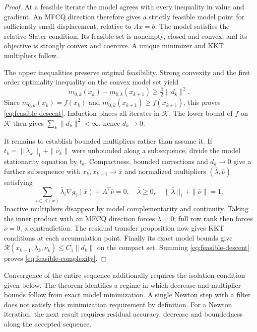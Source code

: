\documentclass[pdflatex,sn-mathphys-num]{sn-jnl}
\theoremstyle{thmstyleone}
\theoremstyle{thmstylethree}
\begin{document}
\begin{proof}
At a feasible iterate the model agrees with every inequality in value
and gradient. An MFCQ direction therefore gives a strictly feasible
model point for sufficiently small displacement, relative to $Ax=b$.
The model satisfies the relative Slater condition. Its feasible set is
nonempty, closed and convex, and its objective is strongly convex and
coercive. A unique minimizer and KKT multipliers follow.

The upper inequalities preserve original feasibility. Strong convexity
and the first order optimality inequality on the convex model set yield
\[
 m_{0,k}(x_k)-m_{0,k}(x_{k+1})
 \geq\tfrac\beta2\|d_k\|^2.
\]
Since $m_{0,k}(x_k)=f(x_k)$ and
$m_{0,k}(x_{k+1})\geq f(x_{k+1})$, this proves
\eqref{eq:feasible-descent}. Induction places all iterates in
$\mathcal K$. The lower bound of $f$ on $\mathcal K$ then gives
$\sum_k\|d_k\|^2<\infty$, hence $d_k\to0$.

It remains to establish bounded multipliers rather than assume it.
If $t_k=\|\lambda_k\|_1+\|\nu_k\|$ were unbounded along a
subsequence, divide the model stationarity equation by $t_k$.
Compactness, bounded corrections and $d_k\to0$ give a further
subsequence with $x_k,x_{k+1}\to\bar x$ and normalized multipliers
$(\bar\lambda,\bar\nu)$ satisfying
\[
 \sum_{i\in\mathcal A(\bar x)}\bar\lambda_i\nabla g_i(\bar x)
      +A^T\bar\nu=0,\quad
 \bar\lambda\geq0,\quad
 \|\bar\lambda\|_1+\|\bar\nu\|=1.
\]
Inactive multipliers disappear by model complementarity and
continuity. Taking the inner product with an MFCQ direction forces
$\bar\lambda=0$; full row rank then forces $\bar\nu=0$, a
contradiction. The residual transfer proposition now gives KKT
conditions at each accumulation point. Finally its exact model bounds
give $\mathcal R(x_{k+1},\lambda_k,\nu_k)\leq C_1\|d_k\|$
on the compact set. Summing \eqref{eq:feasible-descent} proves
\eqref{eq:feasible-complexity}.
\end{proof}

Convergence of the entire sequence additionally requires the isolation
condition given below. The theorem identifies a regime in which decrease and multiplier
bounds follow from exact model minimization. A single Newton step with
a filter does not satisfy this minimization requirement by definition.
For a Newton iteration, the next result requires residual accuracy,
decrease and boundedness along the accepted sequence.
\end{document}
